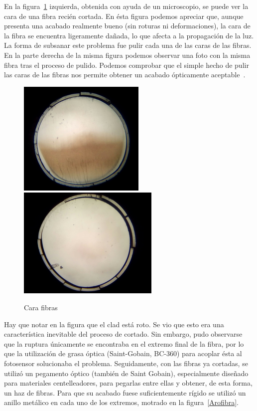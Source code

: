 En la figura~\ref{Pulido} izquierda, obtenida  con ayuda de un microscopio, se puede ver  la cara de una fibra recién cortada. En ésta  figura podemos apreciar que, aunque presenta una acabado realmente bueno (sin roturas ni deformaciones), la cara de la fibra se encuentra ligeramente dañada,  lo que afecta a la propagación de la luz. La forma de subsanar este problema fue pulir cada una de las caras de las fibras. En la parte derecha de la misma figura podemos observar una foto con la misma fibra tras el proceso de pulido. Podemos comprobar que el simple hecho de pulir las caras de las fibras nos permite obtener un acabado ópticamente aceptable~\cite{Alberto, manual}.

\begin{figure}[htb]
\centering
{
\includegraphics[scale=0.5]{SinPulir.png} 
}
{
\includegraphics[scale=0.5]{Pulida.png} 
}
\caption{Cara fibras\label{Pulido}}
\end{figure} 

Hay que notar en la figura que el clad está roto. Se vio que esto era una característica inevitable del proceso de cortado. Sin embargo, pudo observarse que la ruptura únicamente se encontraba en el extremo final de la fibra, por lo que  la utilización de grasa óptica  (Saint-Gobain, BC-360) para acoplar ésta al fotosensor solucionaba el problema. 
Seguidamente, con las fibras ya cortadas, se utilizó un pegamento óptico (también de  Saint Gobain), especialmente diseñado para materiales centelleadores, para pegarlas entre ellas y obtener, de esta forma, un haz de fibras. Para que su acabado fuese suficientemente rígido se utilizó un anillo metálico en cada uno de los extremos, motrado en la figura~\ref{Arofibra}.

